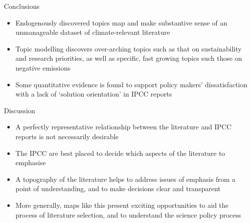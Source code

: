 \documentclass[9pt]{beamer}
\begin{document}

\begin{frame}{Conclusions}


\begin{itemize}
	\item<1-> Endogenously discovered topics map and make substantive sense of an unmanageable dataset of climate-relevant literature
	\item<2-> Topic modelling discovers over-arching topics such as that on sustainability and research priorities, as well as specific, fast growing topics such those on negative emissions
	\item<3-> Some quantitative evidence is found to support policy makers' dissatisfaction with a lack of `solution orientation' in IPCC reports \citep{Kowarsch2017} 
\end{itemize}

\end{frame}

\begin{frame}{Discussion}


\begin{itemize}
	\item<1-> A perfectly representative relationship between the literature and IPCC reports is not necessarily desirable
	\item<2-> The IPCC are best placed to decide which aspects of the literature to emphasise
	\item<3-> A topography of the literature helps to address issues of emphasis from a point of understanding, and to make decisions clear and transparent
	\item<4-> More generally, maps like this present exciting opportunities to aid the process of literature selection, and to understand the science policy process
\end{itemize}

\end{frame}
\end{document}
